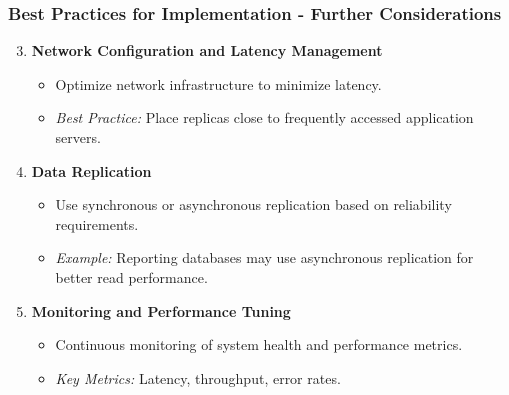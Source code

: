 \documentclass[aspectratio=169]{beamer}
\begin{document}
\begin{frame}[fragile]
    \frametitle{Best Practices for Implementation - Further Considerations}
    \begin{enumerate}
        \setcounter{enumi}{2}
        \item \textbf{Network Configuration and Latency Management}
            \begin{itemize}
                \item Optimize network infrastructure to minimize latency.
                \item \textit{Best Practice:} Place replicas close to frequently accessed application servers.
            \end{itemize}

        \item \textbf{Data Replication}
            \begin{itemize}
                \item Use synchronous or asynchronous replication based on reliability requirements.
                \item \textit{Example:} Reporting databases may use asynchronous replication for better read performance.
            \end{itemize}

        \item \textbf{Monitoring and Performance Tuning}
            \begin{itemize}
                \item Continuous monitoring of system health and performance metrics.
                \item \textit{Key Metrics:} Latency, throughput, error rates.
            \end{itemize}
    \end{enumerate}
\end{frame}
\end{document}
